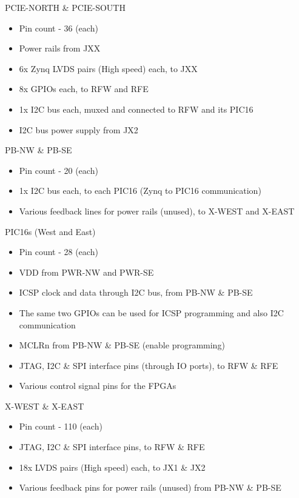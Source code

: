 \documentclass{beamer}
\begin{document}
\begin{frame}{PCIE-NORTH \& PCIE-SOUTH}
    \begin{itemize}
    \item Pin count - 36 (each)
    \item Power rails from JXX
    \item 6x Zynq LVDS pairs (High speed) each, to JXX
    \item 8x GPIOs each, to RFW and RFE 
    \item 1x I2C bus each, muxed and connected to RFW and its PIC16
    \item I2C bus power supply from JX2
    \end{itemize}
\end{frame}

\begin{frame}{PB-NW \& PB-SE}
    \begin{itemize}
    \item Pin count - 20 (each)
    \item 1x I2C bus each, to each PIC16 (Zynq to PIC16 communication)
    \item Various feedback lines for power rails (unused), to X-WEST and X-EAST
    \end{itemize}
\end{frame}

\begin{frame}{PIC16s (West and East)}
    \begin{itemize}
    \item Pin count - 28 (each)
    \item VDD from PWR-NW and PWR-SE
    \item ICSP clock and data through I2C bus, from PB-NW \& PB-SE
    \item The same two GPIOs can be used for ICSP programming and also I2C communication
    \item MCLRn from PB-NW \& PB-SE (enable programming)
    \item JTAG, I2C \& SPI interface pins (through IO ports), to RFW \& RFE
    \item Various control signal pins for the FPGAs
    \end{itemize}
\end{frame}

\begin{frame}{X-WEST \& X-EAST}
    \begin{itemize}
    \item Pin count - 110 (each)
    \item JTAG, I2C \& SPI interface pins, to RFW \& RFE
    \item 18x LVDS pairs (High speed) each, to JX1 \& JX2
    \item Various feedback pins for power rails (unused) from PB-NW \& PB-SE
    \end{itemize}
\end{frame}
\end{document}
